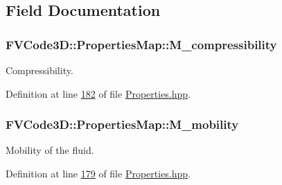 \subsection{Field Documentation}
\subsubsection[{\texorpdfstring{M\+\_\+compressibility}{M_compressibility}}]{ F\+V\+Code3\+D\+::\+Properties\+Map\+::\+M\+\_\+compressibility\hspace{0.3cm}{\ttfamily [private]}}\hypertarget{classFVCode3D_1_1PropertiesMap_a3c5225602e1555d998c454eb4e585022}{}\label{classFVCode3D_1_1PropertiesMap_a3c5225602e1555d998c454eb4e585022}


Compressibility. 



Definition at line \hyperlink{Properties_8hpp_source_l00182}{182} of file \hyperlink{Properties_8hpp_source}{Properties.\+hpp}.

\subsubsection[{\texorpdfstring{M\+\_\+mobility}{M_mobility}}]{ F\+V\+Code3\+D\+::\+Properties\+Map\+::\+M\+\_\+mobility\hspace{0.3cm}{\ttfamily [private]}}\hypertarget{classFVCode3D_1_1PropertiesMap_ad8c21900ff4a979050d999058595d65c}{}\label{classFVCode3D_1_1PropertiesMap_ad8c21900ff4a979050d999058595d65c}


Mobility of the fluid. 



Definition at line \hyperlink{Properties_8hpp_source_l00179}{179} of file \hyperlink{Properties_8hpp_source}{Properties.\+hpp}.

